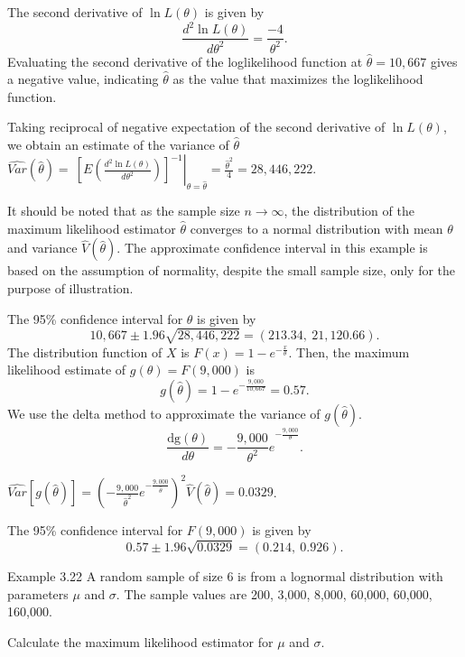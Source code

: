 \documentclass[]{book}
\begin{document}
The second derivative of \(\ln L \left( \theta \right)\) is given by
\[\frac{d^{2}\ln L\left( \theta \right)}{d\theta^{2}} = \frac{- 4}{\theta^{2}}.\]
Evaluating the second derivative of the loglikelihood function at
\(\hat{\theta} = 10,667\) gives a negative value, indicating
\(\hat{\theta}\) as the value that maximizes the loglikelihood function.

Taking reciprocal of negative expectation of the second derivative of
\(\ln L \left( \theta \right)\), we obtain an estimate of the variance
of \(\hat{\theta}\)
\(\widehat{Var}\left( \hat{\theta} \right) = \left. \ \left\lbrack E\left( \frac{d^{2}\ln L \left( \theta \right)}{d\theta^{2}} \right) \right\rbrack^{- 1} \right|_{\theta = \hat{\theta}} = \frac{{\hat{\theta}}^{2}}{4} = 28,446,222\).

It should be noted that as the sample size \(n \rightarrow \infty\), the
distribution of the maximum likelihood estimator \(\hat{\theta}\)
converges to a normal distribution with mean \(\theta\) and variance
\(\hat{V}\left( \hat{\theta} \right)\). The approximate confidence
interval in this example is based on the assumption of normality,
despite the small sample size, only for the purpose of illustration.

The 95\% confidence interval for \(\theta\) is given by
\[10,667 \pm 1.96\sqrt{28,446,222} = \left( 213.34,\ 21,120.66 \right).\]
The distribution function of \(X\) is
\(F\left( x \right) = 1 - e^{- \frac{x}{\theta}}\). Then, the maximum
likelihood estimate of
\(g\left( \theta \right) = F\left( 9,000 \right)\) is
\[g\left( \hat{\theta} \right) = 1 - e^{- \frac{9,000}{10,667}} = 0.57.\]
We use the delta method to approximate the variance of
\(g\left( \hat{\theta} \right)\).
\[\frac{\text{dg}\left( \theta \right)}{d \theta} = {- \frac{9,000}{\theta^{2}}e}^{- \frac{9,000}{\theta}}.\]

\(\widehat{Var}\left\lbrack g\left( \hat{\theta} \right) \right\rbrack = \left( - {\frac{9,000}{{\hat{\theta}}^{2}}e}^{- \frac{9,000}{\hat{\theta}}} \right)^{2}\hat{V}\left( \hat{\theta} \right) = 0.0329\).

The 95\% confidence interval for \(F\left( 9,000 \right)\) is given by
\[0.57 \pm 1.96\sqrt{0.0329} = \left( 0.214,\ 0.926 \right).\]

Example 3.22 A random sample of size 6 is from a lognormal distribution
with parameters \(\mu\) and \(\sigma\). The sample values are 200,
3,000, 8,000, 60,000, 60,000, 160,000.

Calculate the maximum likelihood estimator for \(\mu\) and \(\sigma\).
\end{document}

